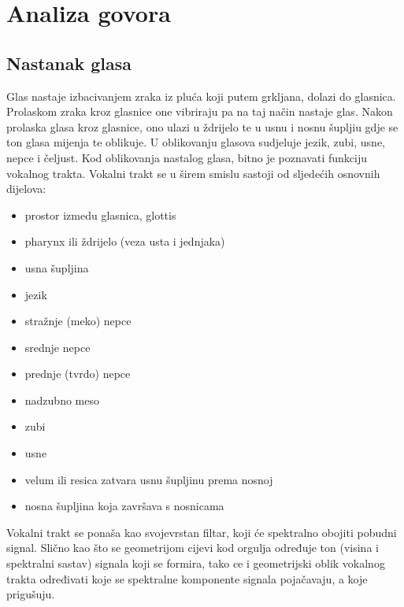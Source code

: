 \documentclass[times, utf8, diplomski]{fer}
\begin{document}
\chapter{Analiza govora}
\section{Nastanak glasa}
Glas nastaje izbacivanjem zraka iz pluća koji putem grkljana, dolazi do glasnica. Prolaskom zraka kroz glasnice one vibriraju pa na taj način nastaje glas. Nakon prolaska glasa kroz glasnice, ono ulazi u ždrijelo te u usnu i nosnu šupljiu gdje se ton glasa mijenja te oblikuje. U oblikovanju glasova sudjeluje jezik, zubi, usne, nepce i čeljust.
Kod oblikovanja nastalog glasa, bitno je poznavati funkciju vokalnog trakta. Vokalni trakt se u širem smislu sastoji od sljedećih osnovnih dijelova:
\begin{itemize}
\item prostor izmedu glasnica, glottis
\item pharynx ili ždrijelo (veza usta i jednjaka)
\item usna šupljina
\item jezik
\item stražnje (meko) nepce
\item srednje nepce
\item prednje (tvrdo) nepce
\item nadzubno meso
\item zubi
\item usne
\item velum ili resica zatvara usnu šupljinu prema nosnoj
\item nosna šupljina koja završava s nosnicama
\end{itemize}
Vokalni trakt se ponaša kao svojevrstan filtar, koji će spektralno obojiti pobudni signal. Slično kao što se geometrijom cijevi kod orgulja određuje ton (visina i spektralni sastav) signala koji se formira, tako ce i geometrijski oblik vokalnog trakta određivati koje se spektralne komponente signala pojačavaju, a koje prigušuju.
\end{document}
